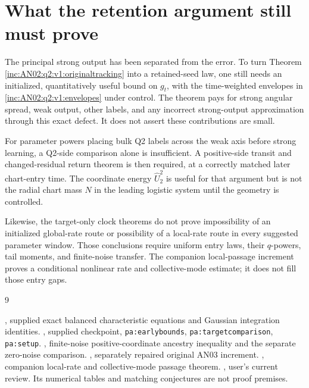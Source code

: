 \documentclass[11pt]{article}
\numberwithin{equation}{section}
\theoremstyle{remark}\newtheorem{remark}[theorem]{Remark}
\begin{document}
\section{What the retention argument still must prove}
\label{inc:AN02:q2:v1:residue}
The principal strong output has been separated from the error. To turn
Theorem \ref{inc:AN02:q2:v1:originaltracking} into a retained-seed law,
one still needs an initialized, quantitatively useful bound on $g_t$,
with the time-weighted envelopes in \eqref{inc:AN02:q2:v1:envelopes}
under control. The theorem pays for strong angular spread, weak output,
other labels, and any incorrect strong-output approximation through
this exact defect. It does not assert these contributions are small.

For parameter powers placing bulk Q2 labels across the weak axis before
strong learning, a Q2-side comparison alone is insufficient. A positive-side
transit and changed-residual return theorem is then required, at a
correctly matched later chart-entry time. The coordinate energy
$\widehat U_2^2$ is useful for that argument but is not the radial chart
mass $N$ in the leading logistic system until the geometry is controlled.

Likewise, the target-only clock theorems do not prove impossibility of
an initialized global-rate route or possibility of a local-rate route
in every suggested parameter window. Those conclusions require uniform
entry laws, their $q$-powers, tail moments, and finite-noise transfer.
The companion local-passage increment proves a conditional nonlinear
rate and collective-mode estimate; it does not fill those entry gaps.

\begin{thebibliography}{9}\small\raggedright
\setlength{\itemsep}{2pt}\setlength{\parskip}{0pt}
, supplied exact
balanced characteristic equations and Gaussian integration identities.
, supplied checkpoint,
\texttt{pa:earlybounds}, \texttt{pa:targetcomparison}, \texttt{pa:setup}.
,
finite-noise positive-coordinate ancestry inequality and the separate
zero-noise comparison.
,
separately repaired original AN03 increment.
, companion
local-rate and collective-mode passage theorem.
, user's current review. Its
numerical tables and matching conjectures are not proof premises.
\end{thebibliography}
\end{document}
